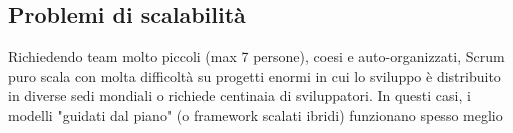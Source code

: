 \subsection{Problemi di scalabilità}
Richiedendo team molto piccoli (max 7 persone), coesi e auto-organizzati, Scrum puro scala con molta difficoltà su progetti enormi in cui lo sviluppo è distribuito in diverse sedi mondiali o richiede centinaia di sviluppatori. In questi casi, i modelli "guidati dal piano" (o framework scalati ibridi) funzionano spesso meglio